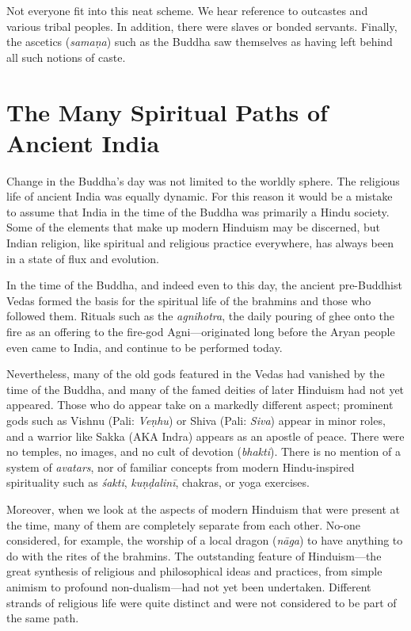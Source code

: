 \documentclass[12pt,openany]{book}%
\begin{document}
Not everyone fit into this neat scheme. We hear reference to outcastes and various tribal peoples. In addition, there were slaves or bonded servants. Finally, the ascetics (\textit{\textsanskrit{samaṇa}}) such as the Buddha saw themselves as having left behind all such notions of caste.

\section*{The Many Spiritual Paths of Ancient India}

Change in the Buddha’s day was not limited to the worldly sphere. The religious life of ancient India was equally dynamic. For this reason it would be a mistake to assume that India in the time of the Buddha was primarily a Hindu society. Some of the elements that make up modern Hinduism may be discerned, but Indian religion, like spiritual and religious practice everywhere, has always been in a state of flux and evolution.

In the time of the Buddha, and indeed even to this day, the ancient pre-Buddhist Vedas formed the basis for the spiritual life of the brahmins and those who followed them. Rituals such as the \textit{agnihotra}, the daily pouring of ghee onto the fire as an offering to the fire-god Agni—originated long before the Aryan people even came to India, and continue to be performed today.

Nevertheless, many of the old gods featured in the Vedas had vanished by the time of the Buddha, and many of the famed deities of later Hinduism had not yet appeared. Those who do appear take on a markedly different aspect; prominent gods such as Vishnu (Pali: \textit{\textsanskrit{Veṇhu}}) or Shiva (Pali: \textit{Siva}) appear in minor roles, and a warrior like Sakka (AKA Indra) appears as an apostle of peace. There were no temples, no images, and no cult of devotion (\textit{bhakti}). There is no mention of a system of \textit{avatars}, nor of familiar concepts from modern Hindu-inspired spirituality such as \textit{\textsanskrit{śakti}}, \textit{\textsanskrit{kuṇḍalinī}}, chakras, or yoga exercises.

Moreover, when we look at the aspects of modern Hinduism that were present at the time, many of them are completely separate from each other. No-one considered, for example, the worship of a local dragon (\textit{\textsanskrit{nāga}}) to have anything to do with the rites of the brahmins. The outstanding feature of Hinduism—the great synthesis of religious and philosophical ideas and practices, from simple animism to profound non-dualism—had not yet been undertaken. Different strands of religious life were quite distinct and were not considered to be part of the same path.
\end{document}
